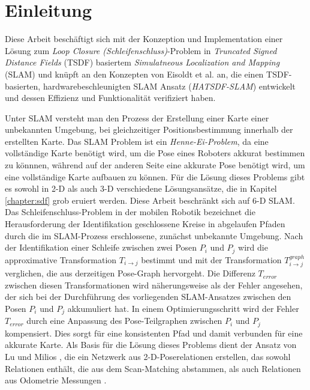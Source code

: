 \chapter{Einleitung}

Diese Arbeit beschäftigt sich mit der Konzeption und Implementation einer Lösung zum \emph{Loop Closure  (Schleifenschluss)}-Problem in \textit{Truncated Signed Distance Fields} (TSDF) basiertem \textit{Simulatneous Localization and Mapping} (SLAM) und knüpft an den Konzepten von Eisoldt et al. \cite{HATSDF} an, die einen TSDF-basierten, hardwarebeschleunigten SLAM Ansatz (\emph{HATSDF-SLAM}) entwickelt und dessen Effizienz und Funktionalität verifiziert haben.

Unter SLAM versteht man den Prozess der Erstellung einer Karte einer unbekannten Umgebung, bei gleichzeitiger Positionsbestimmung innerhalb der erstellten Karte.
Das SLAM Problem ist ein \textit{Henne-Ei-Problem}, da eine vollständige Karte benötigt wird, um die Pose eines Roboters akkurat bestimmen zu könnnen, während auf der anderen Seite eine akkurate Pose benötigt wird, um eine vollständige Karte aufbauen zu können. Für die Lösung dieses Problems gibt es sowohl in 2-D als auch 3-D verschiedene Lösungsansätze, die in Kapitel \ref{chapter:sdf} grob eruiert werden.
Diese Arbeit beschränkt sich auf 6-D SLAM. Das Schleifenschluss-Problem in der mobilen Robotik bezeichnet die Herausforderung der Identifikation geschlossene Kreise in abgelaufen Pfaden durch die im SLAM-Prozess erschlossene, zunächst unbekannte Umgebung. Nach der Identifikation einer Schleife zwischen zwei Posen $P_i$ und $P_j$ wird die approximative Transformation $T_{i \rightarrow j}$ bestimmt und mit der Transformation $T_{i \rightarrow j}^{graph}$  verglichen, die aus derzeitigen Pose-Graph hervorgeht. Die Differenz $T_{error}$ zwischen diesen Transformationen wird näherungsweise als der Fehler angesehen, der sich bei der Durchführung des vorliegenden SLAM-Ansatzes zwischen den Posen $P_i$ und $P_j$ akkumuliert hat. In einem Optimierungsschritt wird der Fehler $T_{error}$ durch eine Anpassung des Pose-Teilgraphen zwischen $P_i$ und $P_j$ kompensiert. Dies sorgt für eine konsistenten Pfad und damit verbunden für eine akkurate Karte.  Als Basis für die Lösung dieses Problems dient der Ansatz von Lu und Milios \cite{lu1997globally}, die ein Netzwerk aus 2-D-Poserelationen erstellen, das sowohl Relationen enthält, die aus dem Scan-Matching abstammen, als auch Relationen aus Odometrie Messungen \cite{lu1997globally}. 
